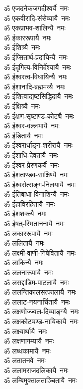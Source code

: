 \begin{multicols}{2}
\begin{flushleft}
ॐ एजदनेकजगदीश्वर्यै~नमः\\
ॐ एकवीरादि-संसेव्यायै~नमः\\
ॐ एकप्राभव-शालिन्यै~नमः\hfill {}\\
ॐ ईकाररूपायै~नमः\\
ॐ ईशित्र्यै~नमः\\
ॐ ईप्सितार्थ-प्रदायिन्यै~नमः\\
ॐ ईदृगित्य-विनिर्देश्यायै~नमः\\
ॐ ईश्वरत्व-विधायिन्यै~नमः\\
ॐ ईशानादि-ब्रह्ममय्यै~नमः\\
ॐ ईशित्वाद्यष्टसिद्धिदायै~नमः\\
ॐ ईक्षित्र्यै~नमः\\
ॐ ईक्षण-सृष्टाण्ड-कोट्यै~नमः\\
ॐ ईश्वर-वल्लभायै~नमः\hfill {}\\
ॐ ईडितायै~नमः\\
ॐ ईश्वरार्धाङ्ग-शरीरायै~नमः\\
ॐ ईशाधि-देवतायै~नमः\\
ॐ ईश्वर-प्रेरणकर्यै~नमः\\
ॐ ईशताण्डव-साक्षिण्यै~नमः\\
ॐ ईश्वरोत्सङ्ग-निलयायै~नमः\\
ॐ ईतिबाधा-विनाशिन्यै~नमः\\
ॐ ईहाविरहितायै~नमः\\
ॐ ईशशक्त्यै~नमः\\
ॐ ईषत्-स्मिताननायै~नमः\hfill {}\\
ॐ लकाररूपायै~नमः\\
ॐ ललितायै~नमः\\
ॐ लक्ष्मी-वाणी-निषेवितायै~नमः\\
ॐ लाकिन्यै~नमः\\
ॐ ललनारूपायै~नमः\\
ॐ लसद्दाडिम-पाटलायै~नमः\\
ॐ ललन्तिकालसत्फालायै~नमः\\
ॐ ललाट-नयनार्चितायै~नमः\\
ॐ लक्षणोज्ज्वल-दिव्याङ्ग्यै~नमः\\
ॐ लक्षकोट्यण्ड-नायिकायै~नमः\hfill {}\\
ॐ लक्ष्यार्थायै~नमः\\
ॐ लक्षणागम्यायै~नमः\\
ॐ लब्धकामायै~नमः\\
ॐ लतातनवे~नमः\\
ॐ ललामराजदलिकायै~नमः\\
ॐ लम्बिमुक्तालताञ्चितायै~नमः\\

\end{flushleft}
\end{multicols}
